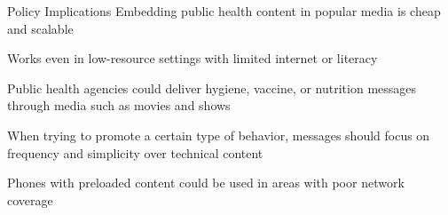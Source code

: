 \documentclass[aspectratio=169]{beamer}
\begin{document}
\begin{frame}{Policy Implications}
	Embedding public health content in popular media is cheap and scalable

	Works even in low-resource settings with limited internet or literacy

	Public health agencies could deliver hygiene, vaccine, or nutrition messages through media such as movies and shows

	When trying to promote a certain type of behavior, messages should focus on frequency and simplicity over technical content 

	Phones with preloaded content could be used in areas with poor network coverage




\end{frame}
\end{document}
